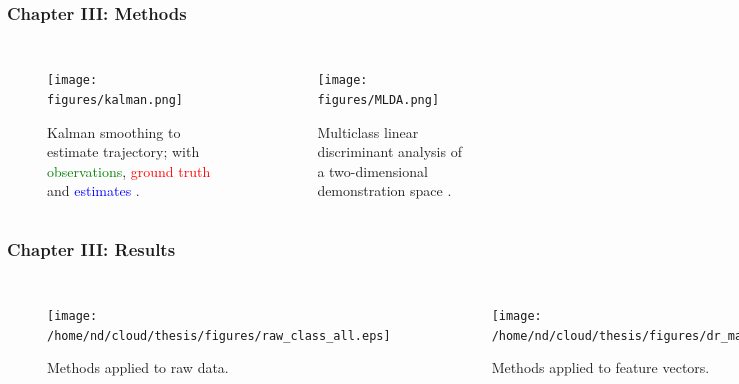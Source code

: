 \documentclass[aspectratio=169]{beamer}
\begin{document}

\begin{frame}[plain]
    \frametitle{Chapter III: Methods}
    \begin{columns}[t] 
        \begin{figure}
            \centering
            \texttt{[image: figures/kalman.png]}
            \caption{Kalman smoothing to estimate trajectory; with \textcolor{green}{observations},
            \textcolor{red}{ground truth} and \textcolor{blue}{estimates} \citep{barber2012bayesian}.}
        \end{figure}
        \begin{figure}
            \centering
            \texttt{[image: figures/MLDA.png]}
            \caption{Multiclass linear discriminant analysis of a two-dimensional demonstration space
            \citep{Bishop:2006:PRM:1162264}.}
        \end{figure}
    \end{columns}
\end{frame}


\begin{frame}[plain]
    \frametitle{Chapter III: Results}
    \begin{columns}[t] 
        \begin{figure}
            \centering
            \texttt{[image: /home/nd/cloud/thesis/figures/raw\_class\_all.eps]}
            \caption{Methods applied to raw data.}
        \end{figure}
        \begin{figure}
            \centering
            \texttt{[image: /home/nd/cloud/thesis/figures/dr\_main.eps]}
            \caption{Methods applied to feature vectors.}
        \end{figure}
    \end{columns}
\end{frame}
\end{document}
